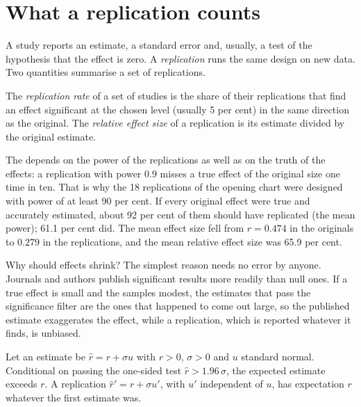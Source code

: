 \section{What a replication counts}\label{sec:b2:behavioural-evidence:replication}

A study reports an estimate, a standard error and, usually, a test of the hypothesis that the effect is
zero. A \emph{replication} runs the same design on new data. Two quantities summarise a set of
replications.

\begin{definition}\label{def:b2:behavioural-evidence:replication-rate}
The \emph{replication rate} of a set of studies is the share of their
replications that find an effect significant at the chosen level (usually 5 per cent) in the same
direction as the original. The \emph{relative effect size} of a replication is its estimate divided by
the original estimate.
\end{definition}

The  depends on the power of the replications as well as on the truth of the effects: a
replication with power $0.9$ misses a true effect of the original size one time in ten. That is why the
18 replications of the opening chart were designed with power of at least 90 per cent. If every original
effect were true and accurately estimated, about 92 per cent of them should have replicated (the mean
power); 61.1 per cent did. The mean effect size fell from $r = 0.474$ in the originals to $0.279$ in the
replications, and the mean relative effect size was 65.9 per cent.

Why should effects shrink? The simplest reason needs no error by anyone. Journals and authors publish
significant results more readily than null ones. If a true effect is small and the samples modest, the
estimates that pass the significance filter are the ones that happened to come out large, so the
published estimate exaggerates the effect, while a replication, which is reported whatever it finds, is
unbiased.

\begin{proposition}\label{prop:b2:behavioural-evidence:filter}
Let an estimate be $\hat r = r + \sigma u$ with $r > 0$, $\sigma > 0$ and $u$ standard normal. Conditional
on passing the one-sided test $\hat r > 1.96\,\sigma$, the expected estimate exceeds $r$. A replication
$\hat r' = r + \sigma u'$, with $u'$ independent of $u$, has expectation $r$ whatever the first estimate
was.
\end{proposition}

